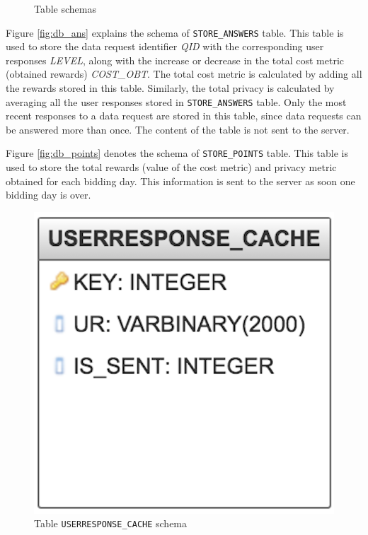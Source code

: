 \begin{figure}[htp]
 \hspace{1em}
\caption{Table schemas}
\label{fig:ts11}
\end{figure}

Figure \ref{fig:db_ans} explains the schema of \texttt{STORE\_ANSWERS} table. This table is used to store the data request identifier \textit{QID} with the corresponding
user responses \textit{LEVEL}, along with the increase or decrease in the total cost metric (obtained rewards) \textit{COST\_OBT}. The total cost metric is calculated by adding all the rewards stored in this table. Similarly, the total privacy is calculated by averaging all the user responses stored in \texttt{STORE\_ANSWERS} table. Only the most recent responses to a data request are stored in this table, since data requests can be answered more than once. The content of the table is not sent to the server.

Figure \ref{fig:db_points} denotes the schema of \texttt{STORE\_POINTS} table. This table is used to store the total rewards (value of the cost metric) and privacy metric obtained for each bidding day.
This information is sent to the server as soon one bidding day is over.

\begin{figure}[ht!]
\centering
\includegraphics[width=0.4\linewidth]{./images/db_ur1}
\caption{Table \texttt{USERRESPONSE\_CACHE} schema}
\label{fig:db_ur}
\end{figure}

